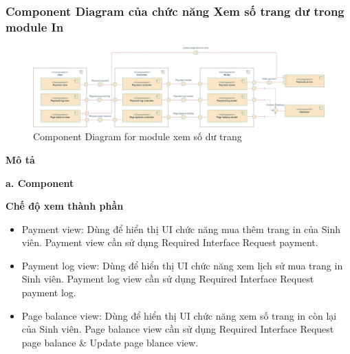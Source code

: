 \documentclass[a4paper]{article}
\begin{document}
\subsubsection{Component Diagram của chức năng Xem số trang dư trong module In}
\begin{figure}[h!]
\begin{center}
\includegraphics[width=16cm]{picture/Buy + view printing page.drawio (2).png}
\caption{Component Diagram for module xem số dư trang}
\end{center}
\end{figure}
\noindent \textbf{Mô tả}

\noindent \textbf{a. Component}

\noindent \textbf{Chế độ xem thành phần}
\begin{itemize}
    \item Payment view: Dùng để hiển thị UI chức năng mua thêm trang in của Sinh viên. Payment view cần sử dụng Required Interface Request payment.
    \item Payment log view: Dùng để hiển thị UI chức năng xem lịch sử mua trang in Sinh viên. Payment log view cần sử dụng Required Interface Request payment log.
    \item Page balance view: Dùng để hiển thị UI chức năng xem số trang in còn lại của Sinh viên. Page balance view cần sử dụng Required Interface Request page balance \& Update page blance view.
\end{itemize}
\end{document}
